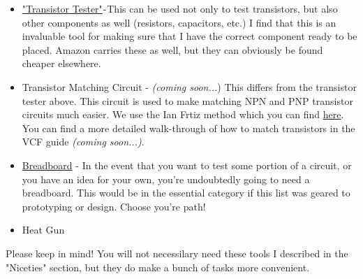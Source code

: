 \documentclass{article}
\begin{document}
\begin{itemize}
	\item \href{https://www.amazon.com/Transistor-DROK-Capacitor-Capacitance-Automatic/dp/B01MS1FOYM/ref=sr_1_1_sspa?dchild=1&keywords=transistor+tester&qid=1596929850&sr=8-1-spons&psc=1&spLa=ZW5jcnlwdGVkUXVhbGlmaWVyPUExQ1k3WThFQURVNUY1JmVuY3J5cHRlZElkPUEwMTAxMDAwSTRCUkg0VTdGVFpTJmVuY3J5cHRlZEFkSWQ9QTA4NTM5NjVHVjI5WEdFMkhFUDAmd2lkZ2V0TmFtZT1zcF9hdGYmYWN0aW9uPWNsaWNrUmVkaXJlY3QmZG9Ob3RMb2dDbGljaz10cnVl}{"Transistor Tester"} - This can be used not only to test transistors, but also other components as well (resistors, capacitors, etc.) I find that this is an invaluable tool for making sure that I have the correct component ready to be placed. Amazon carries these as well, but they can obviously be found cheaper elsewhere.
	\item{Transistor Matching Circuit} - \emph{(coming soon...}) This differs from the transistor tester above. This circuit is used to make matching NPN and PNP transistor circuits much easier. We use the Ian Frtiz method which you can find \href{https://dragonflyalley.com/synth/images/TransistorMatching/ianFritz-transmat0011_144.pdf}{here}. You can find a more detailed walk-through of how to match transistors in the VCF guide \emph{(coming soon...)}.
	\item
	\href{https://www.amazon.com/Breadboard-Solderless-Prototype-PCB-Board/dp/B073XH9GCQ/ref=sr_1_1_sspa?dchild=1&keywords=breadboard&qid=1602427417&sr=8-1-spons&psc=1&spLa=ZW5jcnlwdGVkUXVhbGlmaWVyPUEyRUFRR0pLQTZMMUw3JmVuY3J5cHRlZElkPUEwMzA4NzcwMVBCNTJNVzk5OTExSCZlbmNyeXB0ZWRBZElkPUEwMjQ1ODM4MTdEVVZFSkVFVEk2WSZ3aWRnZXROYW1lPXNwX2F0ZiZhY3Rpb249Y2xpY2tSZWRpcmVjdCZkb05vdExvZ0NsaWNrPXRydWU=}{Breadboard} - In the event that you want to test some portion of a circuit, or you have an idea for your own, you're undoubtedly going to need a breadboard. This would be in the essential category if this list was geared to prototyping or design. Choose you're path!
	\item Heat Gun
\end{itemize} 
Please keep in mind! You will not necessilary need these tools I described in the "Niceties" section, but they do make a bunch of tasks more convenient.
\end{document}
